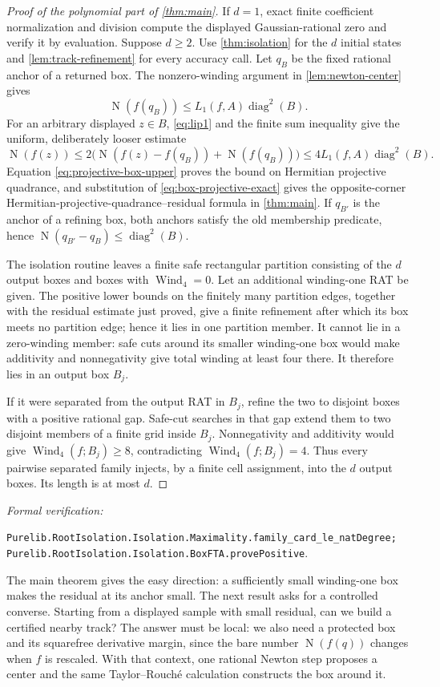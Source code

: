 \documentclass[11pt]{article}
\newcommand{\Norm}[1]{\operatorname{N}\!\left(#1\right)}
\newcommand{\Wind}{\operatorname{Wind}}
\newcommand{\diamq}{\operatorname{diag}^{2}}
\newcommand{\leanref}[1]{\par\smallskip\noindent
  \emph{Formal verification:}\par\nobreak
  {\raggedright\nolinkurl{#1}.\par}}
\begin{document}
\begin{proof}[Proof of the polynomial part of \cref{thm:main}]
If $d=1$, exact finite coefficient normalization and division compute the
displayed Gaussian-rational zero and verify it by evaluation.  Suppose
$d\ge2$.  Use \cref{thm:isolation} for the $d$ initial states and
\cref{lem:track-refinement} for every accuracy call.  Let $q_B$ be the fixed
rational anchor of a returned box.  The nonzero-winding argument in
\cref{lem:newton-center} gives
\[
 \Norm{f(q_B)}\le L_1(f,A)\diamq(B).
\]
For an arbitrary displayed $z\in B$, \cref{eq:lip1} and the finite sum
inequality give the uniform, deliberately looser estimate
\[
 \Norm{f(z)}
 \le2\bigl(\Norm{f(z)-f(q_B)}+\Norm{f(q_B)}\bigr)
 \le4L_1(f,A)\diamq(B).
\]
Equation \eqref{eq:projective-box-upper} proves the bound on Hermitian
projective quadrance, and substitution of \eqref{eq:box-projective-exact} gives
the opposite-corner Hermitian-projective-quadrance--residual formula in
\cref{thm:main}.  If $q_{B'}$ is the anchor of a
refining box, both anchors satisfy the old membership predicate, hence
$\Norm{q_{B'}-q_B}\le\diamq(B)$.

The isolation routine leaves a finite safe rectangular partition consisting
of the $d$ output boxes and boxes with $\Wind_4=0$.  Let an additional
winding-one RAT be given.  The positive lower bounds on the finitely many
partition edges, together with the residual estimate just proved, give a
finite refinement after which its box meets no partition edge; hence it lies
in one partition member.  It cannot lie in a zero-winding member: safe cuts
around its smaller winding-one box would make additivity and nonnegativity
give total winding at least four there.  It therefore lies
in an output box $B_j$.

If it were separated from the output RAT in $B_j$, refine the two to disjoint
boxes with a positive rational gap.  Safe-cut searches in that gap extend
them to two disjoint members of a finite grid inside $B_j$.  Nonnegativity
and additivity would give $\Wind_4(f;B_j)\ge8$, contradicting
$\Wind_4(f;B_j)=4$.  Thus every pairwise separated family injects, by a
finite cell assignment, into the $d$ output boxes.  Its length is at most
$d$.
\end{proof}

\leanref{Purelib.RootIsolation.Isolation.Maximality.family_card_le_natDegree;
Purelib.RootIsolation.Isolation.BoxFTA.provePositive}

The main theorem gives the easy direction: a sufficiently small
winding-one box makes the residual at its anchor small.  The next result asks
for a controlled converse.  Starting from a displayed sample with small
residual, can we build a certified nearby track?  The answer must be local:
we also need a protected box and its squarefree derivative margin, since the
bare number $\Norm{f(q)}$ changes when $f$ is rescaled.  With that context,
one rational Newton step proposes a center and the same Taylor--Rouch\'e
calculation constructs the box around it.
\end{document}

